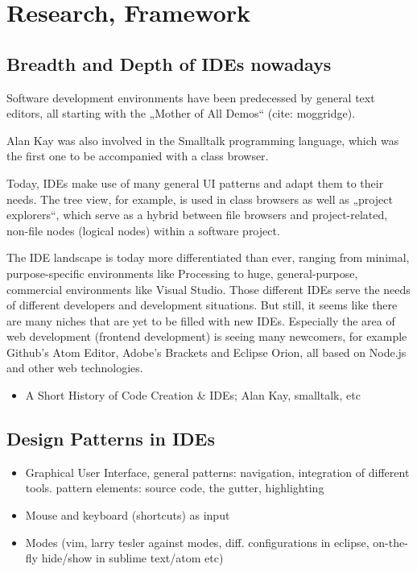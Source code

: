 \chapter{Research, Framework}\label{research-framework}

\section{Breadth and Depth of IDEs
nowadays}\label{breadth-and-depth-of-ides-nowadays}

Software development environments have been predecessed by general text
editors, all starting with the „Mother of All Demos“ (cite: moggridge).

Alan Kay was also involved in the Smalltalk programming language, which
was the first one to be accompanied with a class browser.

Today, IDEs make use of many general UI patterns and adapt them to their
needs. The tree view, for example, is used in class browsers as well as
„project explorers“, which serve as a hybrid between file browsers and
project-related, non-file nodes (logical nodes) within a software
project.

The IDE landscape is today more differentiated than ever, ranging from
minimal, purpose-specific environments like Processing to huge,
general-purpose, commercial environments like Visual Studio. Those
different IDEs serve the needs of different developers and development
situations. But still, it seems like there are many niches that are yet
to be filled with new IDEs. Especially the area of web development
(frontend development) is seeing many newcomers, for example Github’s
Atom Editor, Adobe’s Brackets and Eclipse Orion, all based on Node.js
and other web technologies.

\begin{itemize}
\itemsep1pt\parskip0pt
\item
  A Short History of Code Creation \& IDEs; Alan Kay, smalltalk, etc
\end{itemize}

\section{Design Patterns in IDEs}\label{design-patterns-in-ides}

\begin{itemize}
\itemsep1pt\parskip0pt
\item
  Graphical User Interface, general patterns: navigation, integration of
  different tools. pattern elements: source code, the gutter,
  highlighting
\item
  Mouse and keyboard (shortcuts) as input
\item
  Modes (vim, larry tesler against modes, diff. configurations in
  eclipse, on-the-fly hide/show in sublime text/atom etc)
\end{itemize}

